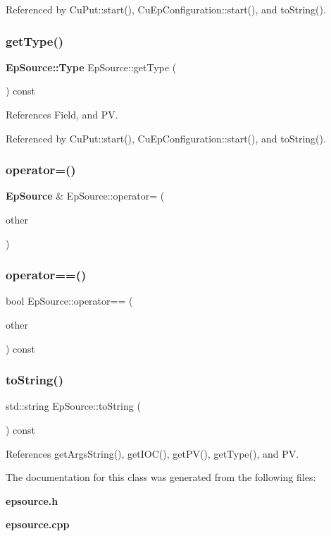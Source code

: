 Referenced by Cu\+Put\+::start(), Cu\+Ep\+Configuration\+::start(), and to\+String().

\mbox{\label{classEpSource_a40cb9e162b05d1272b8330d9f6aef4c2}} 
\subsubsection{get\+Type()}
{\footnotesize\ttfamily \textbf{ Ep\+Source\+::\+Type} Ep\+Source\+::get\+Type (\begin{DoxyParamCaption}{ }\end{DoxyParamCaption}) const}



References Field, and PV.



Referenced by Cu\+Put\+::start(), Cu\+Ep\+Configuration\+::start(), and to\+String().

\mbox{\label{classEpSource_ac1ecad9470b6cf4277d6d6d4f250f8ac}} 
\subsubsection{operator=()}
{\footnotesize\ttfamily \textbf{ Ep\+Source} \& Ep\+Source\+::operator= (\begin{DoxyParamCaption}\item[{const \textbf{ Ep\+Source} \&}]{other }\end{DoxyParamCaption})}

\mbox{\label{classEpSource_a7cb2815e80216a7a287b3e9d0c5780c5}} 
\subsubsection{operator==()}
{\footnotesize\ttfamily bool Ep\+Source\+::operator== (\begin{DoxyParamCaption}\item[{const \textbf{ Ep\+Source} \&}]{other }\end{DoxyParamCaption}) const}

\mbox{\label{classEpSource_a97a1c3a5baf6b530339f583e51439a55}} 
\subsubsection{to\+String()}
{\footnotesize\ttfamily std\+::string Ep\+Source\+::to\+String (\begin{DoxyParamCaption}{ }\end{DoxyParamCaption}) const}



References get\+Args\+String(), get\+I\+O\+C(), get\+P\+V(), get\+Type(), and PV.



The documentation for this class was generated from the following files\+:\begin{DoxyCompactItemize}
\item 
\textbf{ epsource.\+h}\item 
\textbf{ epsource.\+cpp}\end{DoxyCompactItemize}
